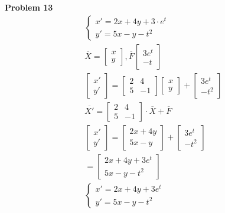 \documentclass[10pt, letterpaper]{article}
\begin{document}
\textbf{Problem 13}
\begin{align*}
\begin{cases}
	x' = 2x+4y+3 \cdot e^t\\
	y' = 5x-y-t^2
\end{cases}\\
\overline{X} = \begin{bmatrix}
	x\\
	y
\end{bmatrix}, \overline{F} \begin{bmatrix}
	3e^{t}\\
	-t
\end{bmatrix}\\
\begin{bmatrix}
	x'\\
	y'
\end{bmatrix} = \begin{bmatrix}
	2 & 4\\
	5 & -1
\end{bmatrix} \begin{bmatrix}
	x\\
	y
\end{bmatrix} + \begin{bmatrix}
	3e^t\\
	-t^2
\end{bmatrix}\\
\overline{X'} = \begin{bmatrix}
	2 & 4\\
	5 & -1
\end{bmatrix} \cdot \overline{X} + \overline{F}\\
\begin{bmatrix}
	x'\\
	y'
\end{bmatrix} = \begin{bmatrix}
	2x+4y\\
	5x-y
\end{bmatrix} + \begin{bmatrix}
	3e^t\\
	-t^2
\end{bmatrix}\\
= \begin{bmatrix}
	2x+4y+3e^t\\
	5x-y-t^2
\end{bmatrix}\\
\begin{cases}
	x'=2x+4y+3e^t\\
	y'=5x-y-t^2
\end{cases}
\end{align*}
\end{document}
